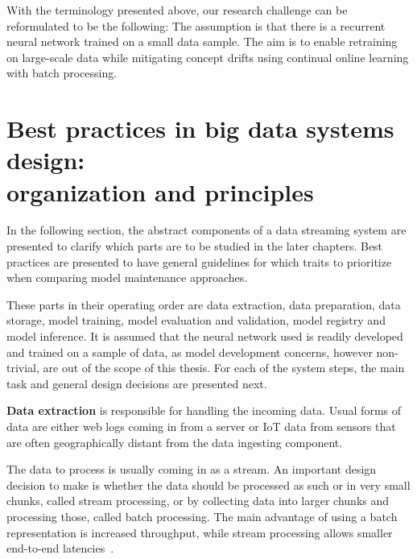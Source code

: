 With the terminology presented above, our research challenge can be reformulated to be the following: The assumption is that there is a recurrent neural network trained on a small data sample. The aim is to enable retraining on large-scale data while mitigating concept drifts using continual online learning with batch processing. 



\section[Best practices in big data systems design: organization and principles]{Best practices in big data systems design:\\ organization and principles}

In the following section, the abstract components of a data streaming system are presented to clarify which parts are to be studied in the later chapters. Best practices are presented to have general guidelines for which traits to prioritize when comparing model maintenance approaches.

These parts in their operating order are data extraction, data preparation, data storage, model training, model evaluation and validation, model registry and model inference. It is assumed that the neural network used is readily developed and trained on a sample of data, as model development concerns, however non-trivial, are out of the scope of this thesis. For each of the system steps, the main task and general design decisions are presented next.

\textbf{Data extraction} is responsible for handling the incoming data. Usual forms of data are either web logs coming in from a server or IoT data from sensors that are often geographically distant from the data ingesting component.

The data to process is usually coming in as a stream. An important design decision to make is whether the data should be processed as such or in very small chunks, called stream processing, or by collecting data into larger chunks and processing those, called batch processing. The main advantage of using a batch representation is increased throughput, while stream processing allows smaller end-to-end latencies~\cite{mci/Feick2018}. 

